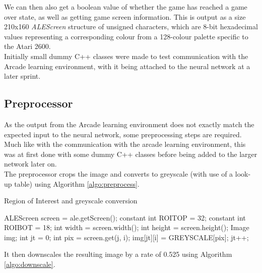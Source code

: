\documentclass[10pt]{article}
\begin{document}
		We can then also get a boolean value of whether the game has reached a game over state, as well as getting game screen information. This is output as a size 210x160 \textit{ALEScreen} structure of unsigned characters, which are 8-bit hexadecimal values representing a corresponding colour from a 128-colour palette specific to the Atari 2600.\\
		
		Initially small dummy C++ classes were made to test communication with the Arcade learning environment, with it being attached to the neural network at a later sprint.
	\medskip
	
	\subsection{Preprocessor}
	
	As the output from the Arcade learning environment does not exactly match the expected input to the neural network, some preprocessing steps are required. Much like with the communication with the arcade learning environment, this was at first done with some dummy C++ classes before being added to the larger network later on.\\
	
	The preprocessor crops the image and converts to greyscale (with use of a look-up table) using Algorithm \ref{algo:preprocess}.
	
		\begin{algorithm}[h]
			\caption{Region of Interest and greyscale conversion}
			\label{algo:preprocess}
			\begin{algorithmic}[1]
				\State ALEScreen screen = ale.getScreen();
				\State constant int ROI\textunderscore TOP = 32; constant int ROI\textunderscore BOT = 18;	
				\State int width = screen.width(); int height = screen.height();
				\State Image img;
				\State
				\State int jt = 0;
						\State int pix = screen.get(j, i);
						\State img[jt][i] = GREYSCALE[pix];		
					\EndFor
					\State jt++;
				\EndFor
			\end{algorithmic}
		\end{algorithm} 
	It then downscales the resulting image by a rate of 0.525 using Algorithm \ref{algo:downscale}.
		
\end{document}
